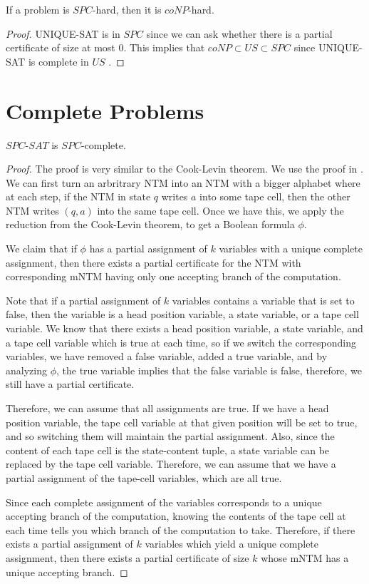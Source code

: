 \documentclass[runningheads,a4paper]{llncs}
\begin{document}
\begin{proposition}
If a problem is $SPC$-hard, then it is $coNP$-hard. 
\end{proposition}

\begin{proof}
UNIQUE-SAT is in $SPC$ since we can ask whether there is a partial certificate of size at most $0$. This implies that $coNP \subset US \subset SPC$ since UNIQUE-SAT is complete in $US$ \cite{blass1982unique}.
\end{proof}

\section{Complete Problems}
\label{sec:complete}

\begin{theorem}
$SPC$-$SAT$ is $SPC$-complete.
\end{theorem}

\begin{proof}
The proof is very similar to the Cook-Levin theorem. We use the proof in \cite{Garey}. We can first turn an arbritrary NTM into an NTM with a bigger alphabet where at each step, if the NTM in state $q$ writes $a$ into some tape cell, then the other NTM writes $(q,a)$ into the same tape cell. Once we have this, we apply the reduction from the Cook-Levin theorem, to get a Boolean formula $\phi$. 

We claim that if $\phi$ has a partial assignment of $k$ variables with a unique complete assignment, then there exists a partial certificate for the NTM with corresponding mNTM having only one accepting branch of the computation.

Note that if a partial assignment of $k$ variables contains a variable that is set to false, then the variable is a head position variable, a state variable, or a tape cell variable. We know that there exists a head position variable, a state variable, and a tape cell variable which is true at each time, so if we switch the corresponding variables, we have removed a false variable, added a true variable, and by analyzing $\phi$, the true variable implies that the false variable is false, therefore, we still have a partial certificate. 

Therefore, we can assume that all assignments are true. If we have a head position variable, the tape cell variable at that given position will be set to true, and so switching them will maintain the partial assignment. Also, since the content of each tape cell is the state-content tuple, a state variable can be replaced by the tape cell variable. Therefore, we can assume that we have a partial assignment of the tape-cell variables, which are all true. 

Since each complete assignment of the variables corresponds to a unique accepting branch of the computation, knowing the contents of the tape cell at each time tells you which branch of the computation to take. Therefore, if there exists a partial assignment of $k$ variables which yield a unique complete assignment, then there exists a partial certificate of size $k$ whose mNTM has a unique accepting branch.
\end{proof}
\end{document}
